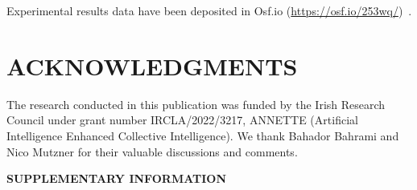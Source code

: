 \documentclass{article}
\begin{document}
Experimental results data have been deposited in Osf.io (\href{https://osf.io/253wq/}{https://osf.io/253wq/})~\cite{database}. 

\section*{ACKNOWLEDGMENTS}
The research conducted in this publication was funded by the Irish Research Council under grant number IRCLA/2022/3217, ANNETTE (Artificial Intelligence Enhanced Collective Intelligence).
We thank Bahador Bahrami and Nico Mutzner for their valuable discussions and comments. 





\clearpage
\appendix
\clearpage
\begin{center}
    \textbf{\LARGE SUPPLEMENTARY INFORMATION}
\end{center}
\bigskip
\end{document}
